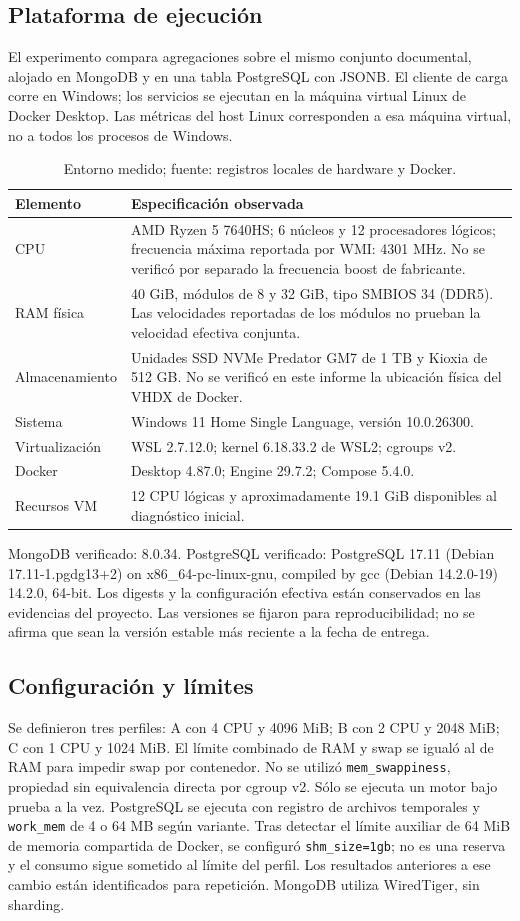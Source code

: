 \documentclass[11pt,letterpaper]{article}
\begin{document}
\subsection{Plataforma de ejecución}
El experimento compara agregaciones sobre el mismo conjunto documental, alojado en MongoDB y en una tabla PostgreSQL con JSONB. El cliente de carga corre en Windows; los servicios se ejecutan en la máquina virtual Linux de Docker Desktop. Las métricas del host Linux corresponden a esa máquina virtual, no a todos los procesos de Windows.
\begin{table}[H]\centering\small
\begin{tabular}{p{4.4cm}p{10cm}}\toprule
Elemento & Especificación observada\\\midrule
CPU & AMD Ryzen 5 7640HS; 6 núcleos y 12 procesadores lógicos; frecuencia máxima reportada por WMI: 4301 MHz. No se verificó por separado la frecuencia boost de fabricante.\\
RAM física & 40 GiB, módulos de 8 y 32 GiB, tipo SMBIOS 34 (DDR5). Las velocidades reportadas de los módulos no prueban la velocidad efectiva conjunta.\\
Almacenamiento & Unidades SSD NVMe Predator GM7 de 1 TB y Kioxia de 512 GB. No se verificó en este informe la ubicación física del VHDX de Docker.\\
Sistema & Windows 11 Home Single Language, versión 10.0.26300.\\
Virtualización & WSL 2.7.12.0; kernel 6.18.33.2 de WSL2; cgroups v2.\\
Docker & Desktop 4.87.0; Engine 29.7.2; Compose 5.4.0.\\
Recursos VM & 12 CPU lógicas y aproximadamente 19.1 GiB disponibles al diagnóstico inicial.\\\bottomrule
\end{tabular}\caption{Entorno medido; fuente: registros locales de hardware y Docker.}\end{table}
MongoDB verificado: 8.0.34. PostgreSQL verificado: PostgreSQL 17.11 (Debian 17.11-1.pgdg13+2) on x86\_64-pc-linux-gnu, compiled by gcc (Debian 14.2.0-19) 14.2.0, 64-bit. Los digests y la configuración efectiva están conservados en las evidencias del proyecto. Las versiones se fijaron para reproducibilidad; no se afirma que sean la versión estable más reciente a la fecha de entrega.
\subsection{Configuración y límites}
Se definieron tres perfiles: A con 4 CPU y 4096 MiB; B con 2 CPU y 2048 MiB; C con 1 CPU y 1024 MiB. El límite combinado de RAM y swap se igualó al de RAM para impedir swap por contenedor. No se utilizó \texttt{mem\_swappiness}, propiedad sin equivalencia directa por cgroup v2. Sólo se ejecuta un motor bajo prueba a la vez.
PostgreSQL se ejecuta con registro de archivos temporales y \texttt{work\_mem} de 4 o 64 MB según variante. Tras detectar el límite auxiliar de 64 MiB de memoria compartida de Docker, se configuró \texttt{shm\_size=1gb}; no es una reserva y el consumo sigue sometido al límite del perfil. Los resultados anteriores a ese cambio están identificados para repetición. MongoDB utiliza WiredTiger, sin sharding.
\end{document}
